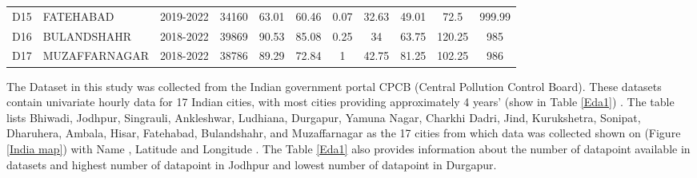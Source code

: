 \documentclass[a4paper,fleqn]{cas-sc}
\begin{document}
\begin{table}[h!]
\begin{tabular}{llccccccccc}
 D15 &  FATEHABAD      & 2019-2022 & 34160 & 63.01 & 60.46 & 0.07 & 32.63   & 49.01       & 72.5    & 999.99 \\
 D16 &  BULANDSHAHR  & 2018-2022 & 39869  & 90.53 & 85.08 & 0.25 & 34      & 63.75       & 120.25  & 985    \\ 
 D17 &  MUZAFFARNAGAR  & 2018-2022 & 38786 & 89.29 & 72.84  & 1    & 42.75   & 81.25       & 102.25  & 986    \\ \hline
  \end{tabular}
  \end{table}
  
The Dataset in this study was collected from the Indian government portal CPCB (Central Pollution Control Board). These datasets contain univariate hourly data for 17 Indian cities, with most cities providing approximately 4 years' (show in Table \ref{Eda1}) . The table lists Bhiwadi, Jodhpur, Singrauli, Ankleshwar, Ludhiana, Durgapur, Yamuna Nagar, Charkhi Dadri, Jind, Kurukshetra, Sonipat, Dharuhera, Ambala, Hisar, Fatehabad, Bulandshahr, and Muzaffarnagar as the 17 cities from which data was collected shown on (Figure \ref{India map}) with Name , Latitude and Longitude . The Table \ref{Eda1} also provides information about the number of datapoint available in datasets and  highest number of datapoint in Jodhpur and lowest number of datapoint in Durgapur.
\end{document}
